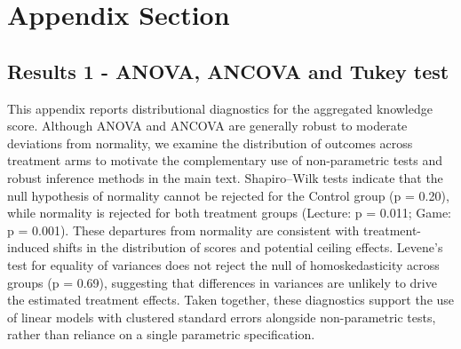 \documentclass[preprint,12pt]{elsarticle}
\begin{document}


\clearpage
\appendix
\section{Appendix Section}
\subsection{Results 1 - ANOVA, ANCOVA and Tukey test}
\label{anova}

This appendix reports distributional diagnostics for the aggregated knowledge score. Although ANOVA and ANCOVA are generally robust to moderate deviations from normality, we examine the distribution of outcomes across treatment arms to motivate the complementary use of non-parametric tests and robust inference methods in the main text.
Shapiro–Wilk tests indicate that the null hypothesis of normality cannot be rejected for the Control group (p = 0.20), while normality is rejected for both treatment groups (Lecture: p = 0.011; Game: p = 0.001). These departures from normality are consistent with treatment-induced shifts in the distribution of scores and potential ceiling effects.
Levene’s test for equality of variances does not reject the null of homoskedasticity across groups (p = 0.69), suggesting that differences in variances are unlikely to drive the estimated treatment effects. Taken together, these diagnostics support the use of linear models with clustered standard errors alongside non-parametric tests, rather than reliance on a single parametric specification. 
\end{document}
